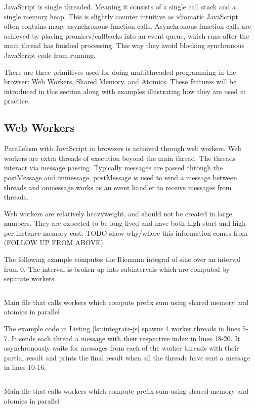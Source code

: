\documentclass[11pt]{article}
\begin{document}
JavaScript is single threaded. Meaning it consists of a single call stack and a single memory heap. This is slightly counter intuitive as idiomatic JavaScript often contains many asynchronous function calls. Asynchronous function calls are achieved by placing promises/callbacks into an event queue, which runs after the main thread has finished processing. This way they avoid blocking synchronous JavaScript code from running. 

There are three primitives used for doing multithreaded programming in the browser: Web Workers, Shared Memory, and Atomics. These features will be introduced in this section along with examples illustrating how they are used in practice. 


\subsection{Web Workers}
Parallelism with JavaScript in browsers is achieved through web workers. Web workers are extra threads of execution beyond the main thread. The threads interact via message passing. Typically messages are passed through the postMessage and onmessage. postMessage is used to send a message between threads and onmessage works as an event handler to receive messages from threads. 


Web workers are relatively heavyweight, and should not be created in large numbers. They are expected to be long lived and have both high start and high per instance memory cost. 
TODO show why/where this information comes from (FOLLOW UP FROM ABOVE)

The following example computes the Riemann integral of sine over an interval from 0. The interval is broken up into subintervals which are computed by separate workers.

\begin{listing}[H] 
        \inputminted[fontsize=\small,baselinestretch=0.5,linenos]{javascript}{code/worker/integrate.js}
        \caption{Main file that calls workers which compute prefix sum using shared memory and atomics in parallel} 
        
        \label{lst:integrate-js}    
\end{listing} 

The example code in Listing \ref{lst:integrate-js} spawns 4 worker threads in lines 5-7. It sends each thread a message with their respective index in lines 18-20. It asynchronously waits for messages from each of the worker threads with their partial result and prints the final result when all the threads have sent a message in lines 10-16.
\begin{listing}[H] 
        \inputminted[fontsize=\small,baselinestretch=0.5,linenos]{javascript}{code/worker/worker.js}
        \caption{Main file that calls workers which compute prefix sum using shared memory and atomics in parallel} 
        \label{lst:worker-js}    
\end{listing}    
\end{document}
